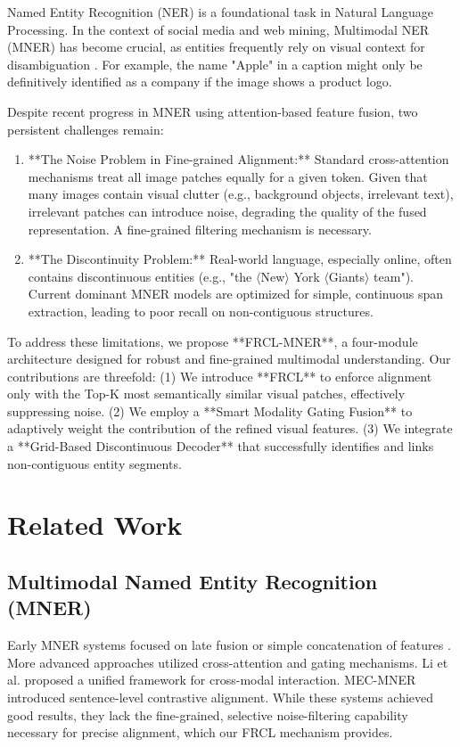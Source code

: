 \documentclass[runningheads]{llncs}
\begin{document}
Named Entity Recognition (NER) is a foundational task in Natural Language Processing. In the context of social media and web mining, Multimodal NER (MNER) has become crucial, as entities frequently rely on visual context for disambiguation \cite{li2020mner}. For example, the name "Apple" in a caption might only be definitively identified as a company if the image shows a product logo.

Despite recent progress in MNER using attention-based feature fusion, two persistent challenges remain:

\begin{enumerate}
    \item **The Noise Problem in Fine-grained Alignment:** Standard cross-attention mechanisms treat all image patches equally for a given token. Given that many images contain visual clutter (e.g., background objects, irrelevant text), irrelevant patches can introduce noise, degrading the quality of the fused representation. A fine-grained filtering mechanism is necessary.
    \item **The Discontinuity Problem:** Real-world language, especially online, often contains discontinuous entities (e.g., "the $\langle$New$\rangle$ York $\langle$Giants$\rangle$ team"). Current dominant MNER models are optimized for simple, continuous span extraction, leading to poor recall on non-contiguous structures.
\end{enumerate}

To address these limitations, we propose **FRCL-MNER**, a four-module architecture designed for robust and fine-grained multimodal understanding. Our contributions are threefold: (1) We introduce **FRCL** to enforce alignment only with the Top-K most semantically similar visual patches, effectively suppressing noise. (2) We employ a **Smart Modality Gating Fusion** to adaptively weight the contribution of the refined visual features. (3) We integrate a **Grid-Based Discontinuous Decoder** that successfully identifies and links non-contiguous entity segments.


\section{Related Work}

\subsection{Multimodal Named Entity Recognition (MNER)}
Early MNER systems focused on late fusion or simple concatenation of features \cite{zhang2018mn}. More advanced approaches utilized cross-attention and gating mechanisms. Li et al. \cite{li2020mner} proposed a unified framework for cross-modal interaction. MEC-MNER \cite{wang2021mec} introduced sentence-level contrastive alignment. While these systems achieved good results, they lack the fine-grained, selective noise-filtering capability necessary for precise alignment, which our FRCL mechanism provides.
\end{document}
